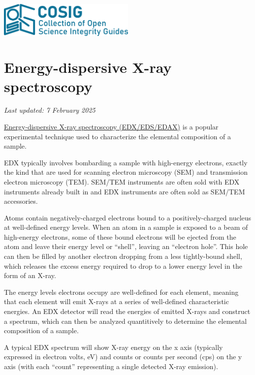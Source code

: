 \documentclass[letterpaper, 12pt]{article}
\begin{document}
\flushleft
\includegraphics[width=0.5\textwidth]{img/home/241017_final_logo_mockup.png}

\section*{Energy-dispersive X-ray spectroscopy}
\textit{Last updated: 7 February 2025}

\href{https://en.wikipedia.org/wiki/Energy-dispersive_X-ray_spectroscopy}{Energy-dispersive X-ray spectroscopy (EDX/EDS/EDAX)} is a popular experimental technique used to characterize the elemental composition of a sample.

EDX typically involves bombarding a sample with high-energy electrons, exactly the kind that are used for scanning electron microscopy (SEM) and transmission electron microscopy (TEM). SEM/TEM instruments are often sold with EDX instruments already built in and EDX instruments are often sold as SEM/TEM accessories.

Atoms contain negatively-charged electrons bound to a positively-charged nucleus at well-defined energy levels. When an atom in a sample is exposed to a beam of high-energy electrons, some of these bound electrons will be ejected from the atom and leave their energy level or ``shell'', leaving an ``electron hole''. This hole can then be filled by another electron dropping from a less tightly-bound shell, which releases the excess energy required to drop to a lower energy level in the form of an X-ray.

The energy levels electrons occupy are well-defined for each element, meaning that each element will emit X-rays at a series of well-defined characteristic energies. An EDX detector will read the energies of emitted X-rays and construct a spectrum, which can then be analyzed quantitively to determine the elemental composition of a sample.

A typical EDX spectrum will show X-ray energy on the x axis (typically expressed in electron volts, eV) and counts or counts per second (cps) on the y axis (with each ``count'' representing a single detected X-ray emission).
\end{document}
